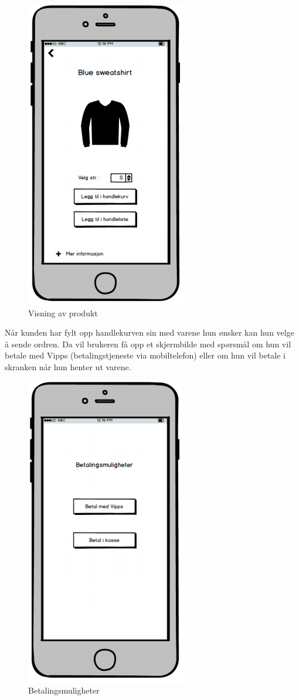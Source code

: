 \begin{figure}[H]
\includegraphics[scale=0.47]{images/prototype1/produkt}
\centering %
\caption{Visning av produkt}
\label{fig:produkt}
\end{figure}

\noindent Når kunden har fylt opp handlekurven sin med varene hun ønsker kan hun velge å sende ordren. Da vil brukeren få opp et skjermbilde med spørsmål om hun vil betale med Vipps (betalingstjeneste via mobiltelefon) eller om hun vil betale i skranken når hun henter ut varene.

\begin{figure}[H]
\includegraphics[scale=0.47]{images/prototype1/betalingsmuligheter}
\centering %
\caption{Betalingsmuligheter}
\label{fig:betalingsmuligheter}
\end{figure}

